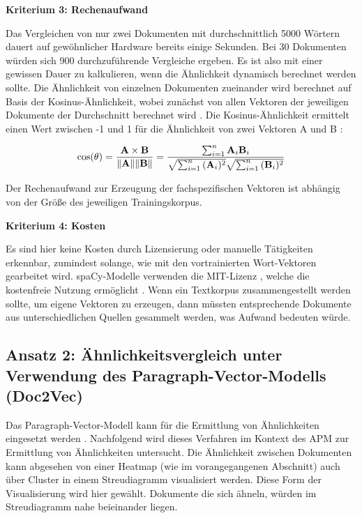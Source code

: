 {\bf Kriterium 3: Rechenaufwand}

Das Vergleichen von nur zwei Dokumenten mit durchschnittlich 5000 Wörtern dauert auf gewöhnlicher Hardware bereits einige Sekunden. Bei 30 Dokumenten würden sich 900 durchzuführende Vergleiche ergeben. Es ist also mit einer gewissen Dauer zu kalkulieren, wenn die Ähnlichkeit dynamisch berechnet werden sollte. Die Ähnlichkeit von einzelnen Dokumenten zueinander wird berechnet auf Basis der Kosinus-Ähnlichkeit, wobei zunächst von allen Vektoren der jeweiligen Dokumente der Durchschnitt berechnet wird \cite{spacy3}. Die Kosinus-Ähnlichkeit ermittelt einen Wert zwischen -1 und 1 für die Ähnlichkeit von zwei Vektoren A und B \cite[S. 84]{Gupta}:	
 
 \begin{equation}
\cos (\theta)= {{\bf A} \times {\bf B} \over \|{\bf A}\| \|{\bf B}\|} = \frac{ \sum_{i=1}^{n}{{\bf A}_i{\bf B}_i} }{ \sqrt{\sum_{i=1}^{n}{({\bf A}_i)^2}} \sqrt{\sum_{i=1}^{n}{({\bf B}_i)^2}} }
\end{equation}

Der Rechenaufwand zur Erzeugung der fachspezifischen Vektoren ist abhängig von der Größe des jeweiligen Trainingskorpus. 

{\bf Kriterium 4: Kosten}

Es sind hier keine Kosten durch Lizensierung oder manuelle Tätigkeiten erkennbar, zumindest solange, wie mit den vortrainierten Wort-Vektoren gearbeitet wird. spaCy-Modelle verwenden die MIT-Lizenz \cite{spacy-license}, welche die kostenfreie Nutzung ermöglicht \cite{MIT}. Wenn ein Textkorpus zusammengestellt werden sollte, um eigene Vektoren zu erzeugen, dann müssten entsprechende Dokumente aus unterschiedlichen Quellen gesammelt werden, was Aufwand bedeuten würde.


\subsection{Ansatz 2: Ähnlichkeitsvergleich unter Verwendung des Paragraph-Vector-Modells (Doc2Vec)}

Das Paragraph-Vector-Modell kann für die Ermittlung von Ähnlichkeiten eingesetzt werden \cite{Dai}. Nachfolgend wird dieses Verfahren im Kontext des APM zur Ermittlung von Ähnlichkeiten untersucht. Die Ähnlichkeit zwischen Dokumenten kann abgesehen von einer Heatmap (wie im vorangegangenen Abschnitt) auch über Cluster in einem Streudiagramm visualisiert werden. Diese Form der Visualisierung wird hier gewählt. Dokumente die sich ähneln, würden im Streudiagramm nahe beieinander liegen. 

